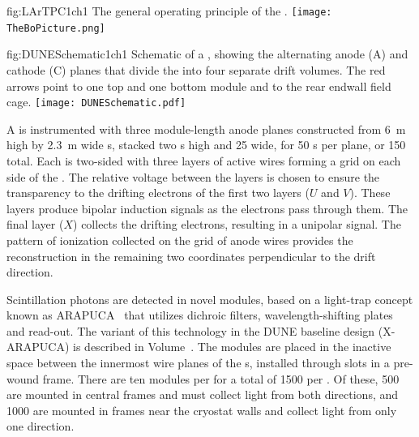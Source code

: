 \begin{dunefigure}{fig:LArTPC1ch1}
{The general operating principle of the  .}
\texttt{[image: TheBoPicture.png]} 
\end{dunefigure}

\begin{dunefigure}{fig:DUNESchematic1ch1}
{Schematic of a \nominalmodsize {}  , showing the alternating anode (A) and cathode (C) planes that divide the  into four separate drift volumes. The red arrows point to one top and one bottom  module and to the rear endwall field cage.}
\texttt{[image: DUNESchematic.pdf]}
\end{dunefigure}

A  is instrumented with three module-length anode planes constructed from \SI{6}{m} high by \SI{2.3}{m} wide s, stacked two s high and 25 wide, for 50 s per plane, or 150 total. 
Each  is two-sided with three layers of active wires forming a grid on each side of the .
 The relative voltage between the layers is chosen to ensure the transparency to the drifting electrons of the first two layers ($U$ and $V$). These layers produce bipolar induction signals as the electrons pass through them. The final layer ($X$) collects the drifting electrons, resulting in a unipolar signal. The pattern of ionization collected on the grid of anode wires provides the reconstruction in the remaining two coordinates perpendicular to the drift direction.


Scintillation photons are detected in 
novel  modules, based on  
a light-trap concept known as 
ARAPUCA~\cite{arapuca_jinst,arpkLNLS,Segreto:2018jdx} that   
utilizes dichroic filters, wavelength-shifting plates and 
 read-out. The variant of this technology in 
the DUNE baseline design (X-ARAPUCA) is described in Volume~\volnumbersp{}.  
The  modules 
are placed in the inactive space between the 
innermost wire planes of the s, installed through 
slots in a pre-wound  frame. 
There are ten  modules per  for a total of 
\num{1500} per .  Of these, \num{500} are mounted in 
central  frames and must collect light from both 
directions, 
and \num{1000} are mounted in frames  near the %
cryostat walls and collect light from only one direction. 

